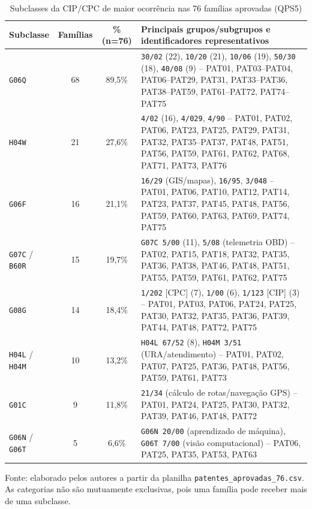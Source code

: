 \documentclass[12pt,a4paper]{article}
\begin{document}
\begin{table}[htbp]
\centering\small
\caption{Subclasses da CIP/CPC de maior ocorrência nas 76 famílias aprovadas (QPS5)}\label{tab:cipfreq}
\begin{tabular}{p{2.2cm}ccp{7.8cm}}
\toprule
\textbf{Subclasse} & \textbf{Famílias} & \textbf{\% (n=76)} & \textbf{Principais grupos/subgrupos e identificadores representativos}\\
\midrule
\texttt{G06Q} & 68 & 89,5\% & \texttt{30/02} (22), \texttt{10/20} (21), \texttt{10/06} (19), \texttt{50/30} (18), \texttt{40/08} (9) -- PAT01, PAT03--PAT04, PAT06--PAT29, PAT31, PAT33--PAT36, PAT38--PAT59, PAT61--PAT72, PAT74--PAT75\\
\texttt{H04W} & 21 & 27,6\% & \texttt{4/02} (16), \texttt{4/029}, \texttt{4/90} -- PAT01, PAT02, PAT06, PAT23, PAT25, PAT29, PAT31, PAT32, PAT35--PAT37, PAT48, PAT51, PAT56, PAT59, PAT61, PAT62, PAT68, PAT71, PAT73, PAT76\\
\texttt{G06F} & 16 & 21,1\% & \texttt{16/29} (GIS/mapas), \texttt{16/95}, \texttt{3/048} -- PAT01, PAT06, PAT10, PAT12, PAT14, PAT23, PAT37, PAT45, PAT48, PAT56, PAT59, PAT60, PAT63, PAT69, PAT74, PAT75\\
\texttt{G07C} / \texttt{B60R} & 15 & 19,7\% & \texttt{G07C 5/00} (11), \texttt{5/08} (telemetria OBD) -- PAT02, PAT15, PAT18, PAT32, PAT35, PAT36, PAT38, PAT46, PAT48, PAT51, PAT55, PAT59, PAT61, PAT62, PAT75\\
\texttt{G08G} & 14 & 18,4\% & \texttt{1/202} [CPC] (7), \texttt{1/00} (6), \texttt{1/123} [CIP] (3) -- PAT01, PAT03, PAT06, PAT24, PAT25, PAT30, PAT32, PAT35, PAT36, PAT39, PAT44, PAT48, PAT72, PAT75\\
\texttt{H04L} / \texttt{H04M} & 10 & 13,2\% & \texttt{H04L 67/52} (8), \texttt{H04M 3/51} (URA/atendimento) -- PAT01, PAT02, PAT07, PAT25, PAT36, PAT48, PAT56, PAT59, PAT61, PAT73\\
\texttt{G01C} & 9 & 11,8\% & \texttt{21/34} (cálculo de rotas/navegação GPS) -- PAT01, PAT24, PAT25, PAT30, PAT32, PAT39, PAT46, PAT48, PAT72\\
\texttt{G06N} / \texttt{G06T} & 5 & 6,6\% & \texttt{G06N 20/00} (aprendizado de máquina), \texttt{G06T 7/00} (visão computacional) -- PAT06, PAT25, PAT35, PAT53, PAT63\\
\bottomrule
\end{tabular}

\smallskip
\footnotesize Fonte: elaborado pelos autores a partir da planilha \texttt{patentes\_aprovadas\_76.csv}. As categorias não são mutuamente exclusivas, pois uma família pode receber mais de uma subclasse.
\end{table}
\end{document}
